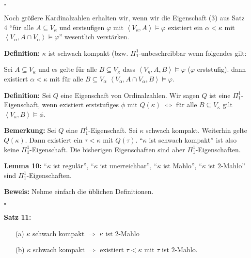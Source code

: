\documentclass[a4paper,fontsize=11pt]{scrartcl}
\begin{document}
\hfill $\square$

Noch größere Kardinalzahlen erhalten wir, wenn wir die Eigenschaft (3)
aus Satz 4 ``für alle $A\subseteq V_\kappa$ und erstsufigen $\varphi$
mit $\left<V_\kappa,A\right>\models\varphi$ existiert ein
$\alpha<\kappa$ mit $\left<V_\alpha,A\cap
V_\alpha\right>\models\varphi$'' wesentlich verstärken.

{\bf Definition:} $\kappa$ ist schwach kompakt
(bzw. $\Pi_1^1$-unbeschreibbar wenn folgendes gilt:

Sei $A\subseteq V_\kappa$ und es gelte für alle $B\subseteq V_\kappa$
dass $\left<V_\kappa, A, B\right>\models\varphi$ ($\varphi$
erststufig). dann existiert $\alpha<\kappa$ mit für alle $B\subseteq
V_\alpha$ $\left<V_\alpha,A\cap V_\alpha,B\right>\models\varphi$.

{\bf Definition:} Sei $Q$ eine Eigenschaft von Ordinalzahlen. Wir
sagen $Q$ ist eine $\Pi_1^1$-Eigenschaft, wenn existiert erststufiges
$\phi$ mit $Q(\kappa)$ $\Leftrightarrow$ für alle $B\subseteq
V_\kappa$ gilt $\left<V_\kappa,B\right>\models\phi$.

{\bf Bemerkung:} Sei $Q$ eine $\Pi_1^1$-Eigenschaft. Sei $\kappa$
schwach kompakt. Weiterhin gelte $Q(\kappa)$. Dann existiert ein
$\tau<\kappa$ mit $Q(\tau)$. ``$\kappa$ ist schwach kompakt'' ist also
keine $\Pi_1^1$-Eigenschaft. Die bisherigen Eigenschaften sind aber
$\Pi_1^1$-Eigenschaften.

{\bf Lemma 10:} ``$\kappa$ ist regulär'', ``$\kappa$ ist
unerreichbar'', ``$\kappa$ ist Mahlo'', ``$\kappa$ ist $2$-Mahlo''
sind $\Pi_1^1$-Eigenschaften.

{\bf Beweis:} Nehme einfach die üblichen Definitionen.

\hfill $\square$

{\bf Satz 11:}
\begin{itemize}
\item[(a)] $\kappa$ schwach kompakt $\Rightarrow$ $\kappa$ ist
  $2$-Mahlo
\item[(b)] $\kappa$ schwach kompakt $\Rightarrow$ existiert
  $\tau<\kappa$ mit $\tau$ ist $2$-Mahlo.
\end{itemize}
\end{document}

